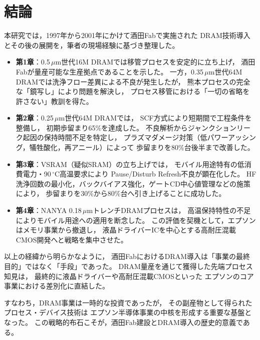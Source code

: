 \documentclass[conference]{IEEEtran}
\begin{document}
\section{結論}

本研究では，1997年から2001年にかけて酒田Fabで実施された
DRAM技術導入とその後の展開を，筆者の現場経験に基づき整理した。

\begin{itemize}
  \item \textbf{第1章}：0.5\,$\mu$m世代16M DRAMでは移管プロセスを安定的に立ち上げ，
        酒田Fabが量産可能な生産拠点であることを示した。
        一方，0.35\,$\mu$m世代64M DRAMでは洗浄フロー差異による不良が発生したが，
        熊本プロセスの完全な「鏡写し」により問題を解決し，
        プロセス移管における「一切の省略を許さない」教訓を得た。
  \item \textbf{第2章}：0.25\,$\mu$m世代64M DRAMでは，
        SCF方式により短期間で工程条件を整備し，
        初期歩留まり65\%を達成した。
        不良解析からジャンクションリーク起因の保持時間不足を特定し，
        プラズマダメージ対策（低パワーアッシング，犠牲酸化，再アニール）によって
        歩留まりを80\%台後半まで改善した。
  \item \textbf{第3章}：VSRAM（疑似SRAM）の立ち上げでは，
        モバイル用途特有の低消費電力・90\,$^\circ$C高温要求により
        Pause/Disturb Refresh不良が顕在化した。
        HF洗浄回数の最小化，バックバイアス強化，ゲートCD中心値管理などの施策により，
        歩留まりを30\%から80\%台へ引き上げることに成功した。
  \item \textbf{第4章}：NANYA 0.18\,$\mu$mトレンチDRAMプロセスは，
        高温保持特性の不足によりモバイル用途への適用を断念した。
        この評価を契機として，エプソンはメモリ事業から撤退し，
        液晶ドライバーICを中心とする高耐圧混載CMOS開発へと戦略を集中させた。
\end{itemize}

以上の経緯から明らかなように，
酒田FabにおけるDRAM導入は「事業の最終目的」ではなく「手段」であった。
DRAM量産を通じて獲得した先端プロセス知見は，
最終的に液晶ドライバーや高耐圧混載CMOSといった
エプソンのコア事業における差別化に直結した。

すなわち，DRAM事業は一時的な投資であったが，
その副産物として得られたプロセス・デバイス技術は
エプソン半導体事業の中核を形成する重要な基盤となった。
この戦略的布石こそが，酒田Fab建設とDRAM導入の歴史的意義である。
\end{document}

